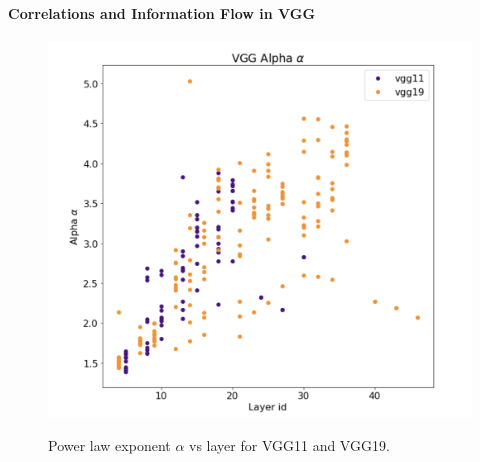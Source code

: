 \paragraph{Correlations and Information Flow in VGG}

\begin{figure}
  \centering
  \includegraphics[scale=0.30]{img/vgg-alpha-layers.png}
  \label{fig:vgg-alpha-layers}
    \caption{Power law exponent $\alpha$ vs layer for VGG11 and VGG19. }
\end{figure}
